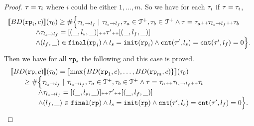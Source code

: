 \begin{proof}
$\mathtt{\tau} = \mathtt{\tau}_i$ where $i$ could be either $1, \ldots, m$.
So we have for each $\mathtt{\tau}_i$ if $\mathtt{\tau} = \mathtt{\tau}_i$, 
\[
  \begin{array}{l}
    \llbracket BD(\mathtt{rp}_i, c) \rrbracket(\mathtt{\tau}_0) \geq
    \# \Big\{\mathtt{\tau}_{l_s \to l_f} ~\vert~ \mathtt{\tau}_{l_s \to l_f}, \mathtt{\tau}_a \in \mathcal{T}^{+}, \mathtt{\tau}_b \in \mathcal{T}^{+}
    \land \mathtt{\tau} = \mathtt{\tau}_a {\scriptscriptstyle ++} \mathtt{\tau}_{l_s \to l_f} {\scriptscriptstyle ++} \mathtt{\tau}_b
    \\ \qquad \qquad
    \land \mathtt{\tau}_{l_s \to l_f} = [(\_, l_s, \_)] {\scriptscriptstyle ++} \mathtt{\tau}' {\scriptscriptstyle ++} [(\_, l_f, \_)]
    \\ \qquad \qquad
    \land (l_{f}, \_) \in \mathtt{final}(\mathtt{rp}_i)
    \land l_s = \mathtt{init}(\mathtt{rp}_i)
    \land \mathtt{cnt}(\mathtt{\tau}', l_s) = \mathtt{cnt}(\mathtt{\tau}', l_f) = 0 
    \Big\}.
      \end{array}
\]
Then we have for all $\mathtt{rp}_i$ the following and this case is proved.
\[
  \begin{array}{l}
    \econfig{BD(\rprog, c)}(\trace_0) = 
    \econfig{ \max\left\{ BD(\rprog_1, c), \ldots, BD(\rprog_m, c) \right\}}(\trace_0)
    \\ \qquad 
    \geq
    \# \Big\{\trace_{l_s \to l_f} ~\vert~ \trace_{l_s \to l_f}, \trace_a \in \ftdom, \trace_b \in \ftdom
    \land \trace = \trace_a \tracecat \trace_{l_s \to l_f} \tracecat \trace_b
    \\ \qquad \qquad
    \land \trace_{l_s \to l_f} = [(\_, l_s, \_)] \tracecat \trace' \tracecat [(\_, l_f, \_)]
    \\ \qquad \qquad
    \land (l_{f}, \_) \in \absfinal(\rprog)
    \land l_s = \absinit(\rprog)
    \land \counter(\trace', l_s) = \counter(\trace', l_f) = 0 
    \Big\}.
      \end{array}
\]


\end{proof}
